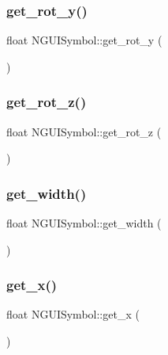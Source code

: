 \subsubsection{\texorpdfstring{get\+\_\+rot\+\_\+y()}{get\_rot\_y()}}
{\footnotesize\ttfamily float N\+G\+U\+I\+Symbol\+::get\+\_\+rot\+\_\+y (\begin{DoxyParamCaption}{ }\end{DoxyParamCaption})}

\hypertarget{class_n_g_u_i_symbol_a1e5abed341b88b9eebcd5382d5ff0fb5}{}\label{class_n_g_u_i_symbol_a1e5abed341b88b9eebcd5382d5ff0fb5} 
\subsubsection{\texorpdfstring{get\+\_\+rot\+\_\+z()}{get\_rot\_z()}}
{\footnotesize\ttfamily float N\+G\+U\+I\+Symbol\+::get\+\_\+rot\+\_\+z (\begin{DoxyParamCaption}{ }\end{DoxyParamCaption})}

\hypertarget{class_n_g_u_i_symbol_ab7eb07155c75b2d7a75396a2b2935a9a}{}\label{class_n_g_u_i_symbol_ab7eb07155c75b2d7a75396a2b2935a9a} 
\subsubsection{\texorpdfstring{get\+\_\+width()}{get\_width()}}
{\footnotesize\ttfamily float N\+G\+U\+I\+Symbol\+::get\+\_\+width (\begin{DoxyParamCaption}{ }\end{DoxyParamCaption})}

\hypertarget{class_n_g_u_i_symbol_ac69888a1613ece8f23ec9f48efb6bde1}{}\label{class_n_g_u_i_symbol_ac69888a1613ece8f23ec9f48efb6bde1} 
\subsubsection{\texorpdfstring{get\+\_\+x()}{get\_x()}}
{\footnotesize\ttfamily float N\+G\+U\+I\+Symbol\+::get\+\_\+x (\begin{DoxyParamCaption}{ }\end{DoxyParamCaption})}

